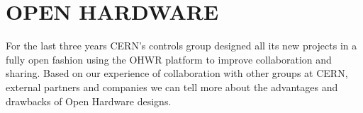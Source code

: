 \documentclass{JAC2003}
\begin{document}
\begin{comment}
\subsection{Release Concept}
Usually, a single product involves several different OHWR projects.
By product, we mean a functional set of carrier and mezzanine boards along with gateware and software (e.g FMC-ADC + SPEC).
For a user to be able to use a product, at least three projects are needed; the carrier project for the golden bitstream, the mezzanine project for the application bitstream and the mezzanine software support project for the Linux device driver and test program.
To have better traceability, a release procedure was put in place.
For each component (gateware or software), the development is frozen into a \textit{release}.
In addition, compatible releases of the gateware and software are bundled together in an archive.
\end{comment}



\section{OPEN HARDWARE}
%

For the last three years CERN's controls group designed all its new projects in a fully open fashion using the OHWR platform to improve collaboration and sharing.
Based on our experience of collaboration with other groups at CERN, external partners and companies we can tell more about the advantages and drawbacks of Open Hardware designs.
\end{document}
